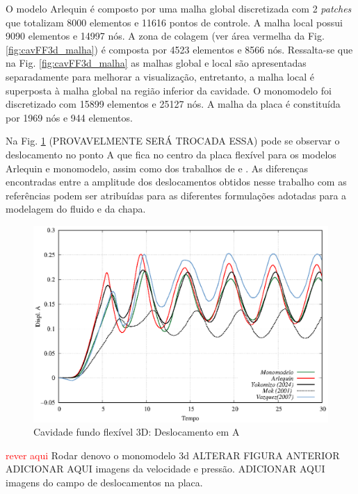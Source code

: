 \documentclass[tese_patricia]{subfiles}
\begin{document}
O modelo Arlequin é composto por uma malha global discretizada com 2 \textit{patches} que totalizam 8000 elementos e 11616 pontos de controle. A malha local possui 9090 elementos e 14997 nós. A zona de colagem (ver área vermelha da Fig. \ref {fig:cavFF3d_malha}) é composta por 4523 elementos e 8566 nós. Ressalta-se que na Fig. \ref {fig:cavFF3d_malha} as malhas global e local são apresentadas separadamente para melhorar a visualização, entretanto, a malha local é superposta à malha global na região inferior da cavidade.  O monomodelo foi discretizado com 15899 elementos e 25127 nós. A malha da placa é constituída por 1969 nós e 944 elementos.

Na Fig. \ref{fig:cavFF3d_deslA} (PROVAVELMENTE SERÁ TROCADA ESSA) pode se observar o deslocamento no ponto A que fica no centro da placa flexível para os modelos Arlequin e monomodelo, assim como dos trabalhos de  e . As diferenças encontradas entre a amplitude dos deslocamentos obtidos nesse trabalho com as referências podem ser atribuídas para as diferentes formulações adotadas para a modelagem do fluido e da chapa.

\begin{figure}[htb!]
	\centering 
	\includegraphics[scale=1.0,trim=0cm 0cm 0cm 0cm, clip=true]{Imagens/Cap7/cavFF3d_deslA.eps}	
	\caption{Cavidade fundo flexível 3D: Deslocamento em A}
	\label{fig:cavFF3d_deslA}
\end{figure}

\textcolor{red}{rever aqui}
Rodar denovo o monomodelo 3d
ALTERAR FIGURA ANTERIOR
ADICIONAR AQUI imagens da velocidade e pressão.
ADICIONAR AQUI imagens do campo de deslocamentos na placa.
\end{document}
